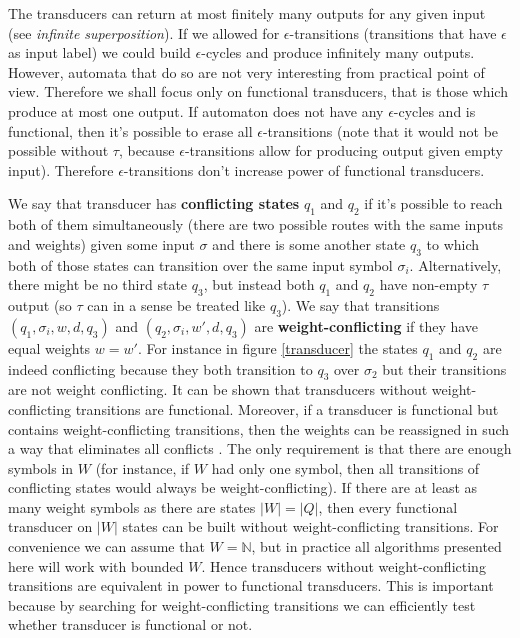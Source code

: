 The transducers can return at most finitely many outputs for any given input (see \textit{infinite superposition}\cite{MendozaDrosik2020MultitapeAA}). If we allowed for $\epsilon$-transitions (transitions that have $\epsilon$ as input label) we could build $\epsilon$-cycles and produce infinitely many outputs. However, automata that do so are not very interesting from practical point of view. Therefore we shall focus only on functional transducers, that is those which produce at most one output. If automaton does not have any $\epsilon$-cycles and is functional, then it's possible to erase all $\epsilon$-transitions (note that it would not be possible without $\tau$, because $\epsilon$-transitions allow for producing output given empty input). Therefore $\epsilon$-transitions don't increase power of functional transducers.

We say that transducer has \textbf{conflicting states} $q_1$ and $q_2$ if it's possible to reach both of them simultaneously (there are two possible routes with the same inputs and weights) given some input $\sigma$ and there is some another state $q_3$ to which both of those states can transition over the same input symbol $\sigma_i$. Alternatively, there might be no third state $q_3$, but instead both $q_1$ and $q_2$ have non-empty $\tau$ output (so $\tau$ can in a sense be treated like $q_3$). We say that transitions $(q_1,\sigma_i,w,d,q_3)$ and $(q_2,\sigma_i,w',d,q_3)$  are \textbf{weight-conflicting} if they have equal weights $w=w'$.  For instance in figure \ref{transducer} the states $q_1$ and $q_2$ are indeed conflicting because they both transition to $q_3$ over $\sigma_2$ but their transitions are not weight conflicting. It can be shown that transducers without weight-conflicting  transitions are functional. Moreover, if a transducer is functional but contains weight-conflicting transitions, then the weights can be reassigned in such a way that eliminates all conflicts \cite{MendozaDrosik2020MultitapeAA}. The only requirement is that there are enough symbols in $W$ (for instance, if $W$ had only one symbol, then all transitions of conflicting states would always be weight-conflicting). If there are at least as many weight symbols as there are states $\vert W \vert = \vert Q \vert$, then every functional transducer on $\vert W \vert$ states can be built without weight-conflicting transitions. For convenience we can assume that $W=\mathbb{N}$, but in practice all algorithms presented here will work with bounded $W$. Hence transducers without weight-conflicting transitions are equivalent in power to functional transducers. This is important because by searching for weight-conflicting transitions we can efficiently test whether transducer is functional or not.

